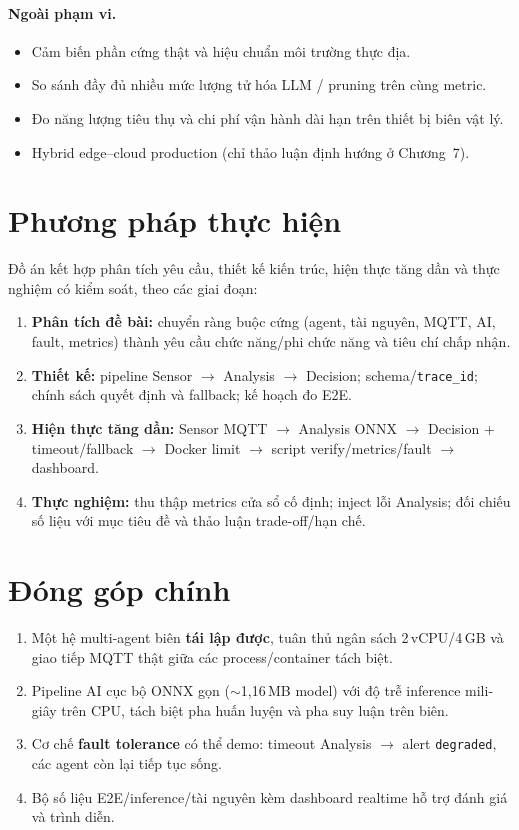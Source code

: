 \documentclass[12pt,a4paper,oneside]{report}
\newcommand{\code}[1]{\texttt{#1}}
\begin{document}
\paragraph{Ngoài phạm vi.}
\begin{itemize}
  \item Cảm biến phần cứng thật và hiệu chuẩn môi trường thực địa.
  \item So sánh đầy đủ nhiều mức lượng tử hóa LLM / pruning trên cùng metric.
  \item Đo năng lượng tiêu thụ và chi phí vận hành dài hạn trên thiết bị biên vật lý.
  \item Hybrid edge--cloud production (chỉ thảo luận định hướng ở Chương~7).
\end{itemize}

\section{Phương pháp thực hiện}

Đồ án kết hợp phân tích yêu cầu, thiết kế kiến trúc, hiện thực tăng dần và thực nghiệm có kiểm soát, theo các giai đoạn:
\begin{enumerate}
  \item \textbf{Phân tích đề bài:} chuyển ràng buộc cứng (agent, tài nguyên, MQTT, AI, fault, metrics) thành yêu cầu chức năng/phi chức năng và tiêu chí chấp nhận.
  \item \textbf{Thiết kế:} pipeline Sensor $\rightarrow$ Analysis $\rightarrow$ Decision; schema/\code{trace\_id}; chính sách quyết định và fallback; kế hoạch đo E2E.
  \item \textbf{Hiện thực tăng dần:} Sensor MQTT $\rightarrow$ Analysis ONNX $\rightarrow$ Decision + timeout/fallback $\rightarrow$ Docker limit $\rightarrow$ script verify/metrics/fault $\rightarrow$ dashboard.
  \item \textbf{Thực nghiệm:} thu thập metrics cửa sổ cố định; inject lỗi Analysis; đối chiếu số liệu với mục tiêu đề và thảo luận trade-off/hạn chế.
\end{enumerate}

\section{Đóng góp chính}

\begin{enumerate}
  \item Một hệ multi-agent biên \textbf{tái lập được}, tuân thủ ngân sách 2\,vCPU/4\,GB và giao tiếp MQTT thật giữa các process/container tách biệt.
  \item Pipeline AI cục bộ ONNX gọn ($\sim$1,16\,MB model) với độ trễ inference mili-giây trên CPU, tách biệt pha huấn luyện và pha suy luận trên biên.
  \item Cơ chế \textbf{fault tolerance} có thể demo: timeout Analysis $\rightarrow$ alert \code{degraded}, các agent còn lại tiếp tục sống.
  \item Bộ số liệu E2E/inference/tài nguyên kèm dashboard realtime hỗ trợ đánh giá và trình diễn.
\end{enumerate}
\end{document}
